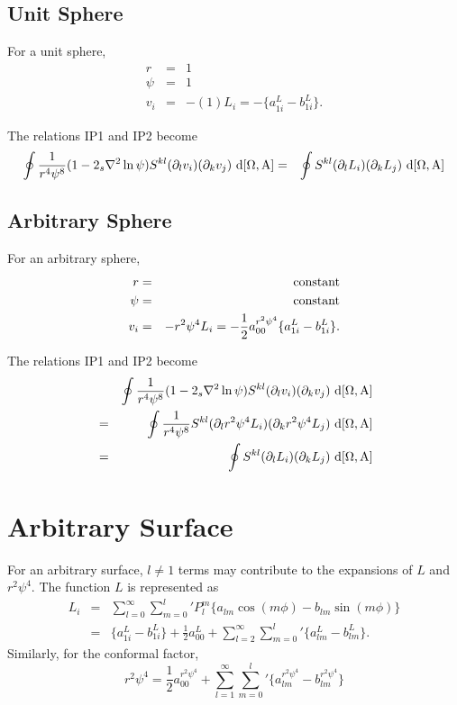 \documentclass[11pt]{article}
\begin{document}
\subsection{Unit Sphere}
For a unit sphere,
\begin{eqnarray}
r &=& 1 \\
\psi &=& 1 \\
v_i &=& -(1) L_{i} =   -\{ a_{1i}^{L}-b_{1i}^{L} \} .
\end{eqnarray}

\noindent
The relations IP1 and IP2 become
\begin{eqnarray}
\oint \frac{1}{r^4 \psi^8}(1-2{_s}\nabla^2 \ln \psi) S^{kl} (\partial_l v_{i})(\partial_k v_{j}) {~\rm d [\Omega,A]}
&=& \oint S^{kl} (\partial_l L_i)(\partial_k L_j) {~\rm d [\Omega,A]}
\end{eqnarray}



\subsection{Arbitrary Sphere}
For an arbitrary sphere,
\begin{eqnarray}
r &=& {\rm constant} \\
\psi &=& {\rm constant} \\
v_i &=& -r^2 \psi^4 L_i = -\frac{1}{2} a_{00}^{r^2 \psi^4} \{ a_{1i}^{L}-b_{1i}^{L} \}.
\end{eqnarray}

\noindent
The relations IP1 and IP2 become
\begin{eqnarray} \nonumber
&&\oint \frac{1}{r^4 \psi^8}(1-2{_s}\nabla^2 \ln \psi) S^{kl} (\partial_l v_{i})(\partial_k v_{j}) {~\rm d [\Omega,A]} \\
&=& \oint \frac{1}{r^4 \psi^8} S^{kl} (\partial_l r^2 \psi^4 L_{i})(\partial_k r^2 \psi^4 L_{j}) {~\rm d [\Omega,A]} \\
&=& \oint S^{kl} (\partial_l  L_{i})(\partial_k  L_{j}) {~\rm d [\Omega,A]}
\end{eqnarray}


\section{Arbitrary Surface}
For an arbitrary surface, $l \ne 1$ terms may contribute to the expansions of $L$ and $r^2 \psi^4$.  The function $L$ is represented as
\begin{eqnarray}
L_i  &=& \sum_{l=0}^{\infty}{\sum_{m=0}^l}' P_l^m \{ a_{lm} \cos(m\phi) - b_{lm}\sin(m\phi)\} \\
&=& \{ a_{1i}^{L}-b_{1i}^{L}  \} + \frac{1}{2} a_{00}^{L} + \sum_{l=2}^{\infty}{\sum_{m=0}^l}' \{ a_{lm}^{L}-b_{lm}^{L}  \}.
\end{eqnarray}
Similarly, for the conformal factor,
\begin{equation}
r^2 \psi^4 = \frac{1}{2} a_{00}^{r^2 \psi^4} + \sum_{l=1}^{\infty}{\sum_{m=0}^l}' \{ a_{lm}^{r^2 \psi^4}-b_{lm}^{r^2 \psi^4}  \} 
\end{equation}
\end{document}
